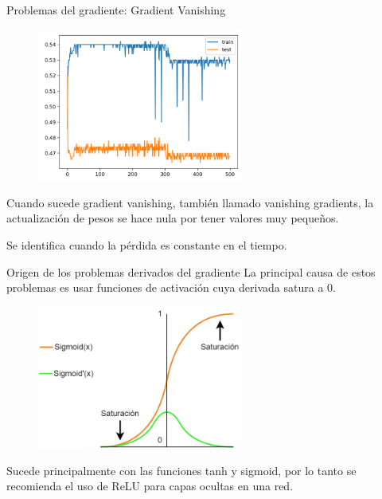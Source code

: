 \begin{frame}{Problemas del gradiente: Gradient Vanishing}
\begin{figure}
    \centering
    \includegraphics[width=0.6\textwidth]{figures/Tema 3/GradientVanishing.png}
    \caption{\cite{GradienVanishing}}
\end{figure}

Cuando sucede \alert{gradient vanishing}, también llamado \alert{vanishing gradients}, la actualización de pesos se hace \alert{nula} por tener valores \alert{muy pequeños}.

Se identifica cuando la pérdida es \alert{constante en el tiempo}.
\end{frame}

\begin{frame}{Origen de los problemas derivados del gradiente}
La principal \alert{causa} de estos problemas es usar \alert{funciones de activación} cuya derivada \alert{satura a 0}.

\begin{figure}
    \centering
    \includegraphics[width=0.6\textwidth]{figures/Tema 3/GradientCause.png}
\end{figure}

Sucede principalmente con las funciones \alert{tanh} y \alert{sigmoid}, por lo tanto se \alert{recomienda} el uso de ReLU para capas ocultas en una red.
\end{frame}

